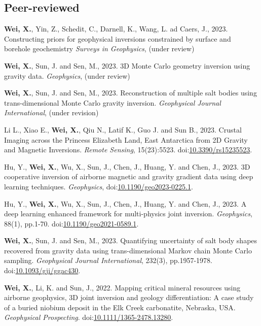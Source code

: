 \documentclass[11pt, a4paper]{article}
\newcommand{\LastName}{Wei}
\newcommand{\Initials}{X}
\newcommand{\Wei}{\textbf{\LastName, \Initials.}}  %
\newcommand{\Review}{under review}
\newcommand{\Revision}{under revision}
\newcommand{\DOI}[1]{doi:\href{https://doi.org/#1}{#1}}
\begin{document}
\subsection*{Peer-reviewed}
\begin{etaremune}
	\item 
	\Wei, Yin, Z., Schedit, C., Darnell, K., Wang, L. ad Caers, J., 2023. Constructing priors for geophysical inversions constrained by surface and borehole geochemistry \emph{Surveys in Geophysics}, (\Review)
	
	\item
	\Wei, Sun, J. and Sen, M., 2023. 3D Monte Carlo geometry inversion using gravity data. \emph{Geophysics}, (\Review)
	
	\item
	\Wei, Sun, J. and Sen, M., 2023. Reconstruction of multiple salt bodies using trans-dimensional Monte Carlo gravity inversion. \emph{Geophysical Journal International}, (\Revision)
	
	\item
	Li L., Xiao E., \Wei, Qiu N., Latif K., Guo J. and Sun B., 2023. Crustal Imaging across the Princess Elizabeth Land, East Antarctica from 2D Gravity and Magnetic Inversions. \emph{Remote Sensing}, 15(23):5523. \DOI{10.3390/rs15235523}.
	
	\item
	Hu, Y., \Wei, Wu, X., Sun, J., Chen, J., Huang, Y. and Chen, J., 2023. 3D cooperative inversion of airborne magnetic and gravity gradient data using deep learning techniques. \emph{Geophysics}, \DOI{10.1190/geo2023-0225.1}.
	
	\item
	Hu, Y., \Wei, Wu, X., Sun, J., Chen, J., Huang, Y. and Chen, J., 2023. A deep learning enhanced framework for multi-physics joint inversion. \emph{Geophysics}, 88(1), pp.1-70. \DOI{10.1190/geo2021-0589.1}.
	
	\item
	\Wei, Sun, J. and Sen, M., 2023. Quantifying uncertainty of salt body shapes recovered from gravity data using trans-dimensional Markov chain Monte Carlo sampling. \emph{Geophysical Journal International}, 232(3), pp.1957-1978. \DOI{10.1093/gji/ggac430}.

	\item
	\Wei, Li, K. and Sun, J., 2022. Mapping critical mineral resources using airborne geophysics, 3D joint inversion and geology differentiation: A case study of a buried niobium deposit in the Elk Creek carbonatite, Nebraska, USA. \emph{Geophysical Prospecting}. \DOI{10.1111/1365-2478.13280}.


\end{etaremune}
\end{document}
